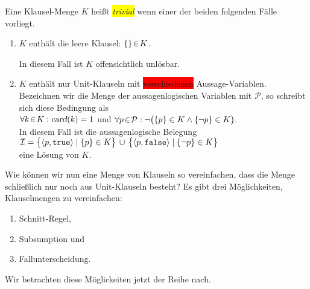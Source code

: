 \begin{Definition}
  Eine Klausel-Menge $K$ hei\ss{}t \colorbox{yellow}{\emph{trivial}} wenn einer der beiden folgenden F\"{a}lle
  vorliegt.
  \begin{enumerate}
  \item $K$ enth\"{a}lt die leere Klausel: \qquad $\{\} \!\in\! K$.

        In diesem Fall ist $K$ offensichtlich unl\"{o}sbar.
  \item $K$ enth\"{a}lt nur Unit-Klauseln mit \colorbox{red}{verschiedenen} Aussage-Variablen.
        Bezeichnen wir die Menge der aussagenlogischen Variablen mit $\mathcal{P}$,
        so schreibt sich diese Bedingung als 
        \\[0.3cm]
        \hspace*{1.3cm}
        $\forall k \!\in\! K: \textsl{card}(k) = 1$ \quad und \quad
        $\forall p \!\in\! \mathcal{P}: \neg\bigl( \{p\} \in K \wedge \{\neg p\} \in K\bigr)$.
        \\[0.3cm]
        In diesem Fall ist die aussagenlogische Belegung
        \\[0.2cm]
        \hspace*{1.3cm}
        $ \I = \bigl\{ \pair(p, \mathtt{true}) \mid \{p\} \in K \bigr\} \,\cup\, \bigl\{
             \pair(p, \mathtt{false}) \mid \{\neg p\} \in K \bigr\} 
        $
        \\[0.2cm]
        eine L\"{o}sung von $K$. \eox
  \end{enumerate}
\end{Definition}


Wie k\"{o}nnen wir nun eine Menge von Klauseln so vereinfachen, dass die Menge schlie\ss{}lich nur
noch aus Unit-Klauseln besteht?  Es gibt drei
M\"{o}glichkeiten, Klauselmengen zu vereinfachen:
\begin{enumerate}
\item Schnitt-Regel,
\item Subsumption und
\item Fallunterscheidung.
\end{enumerate}
Wir betrachten diese M\"{o}glickeiten jetzt der Reihe nach.

